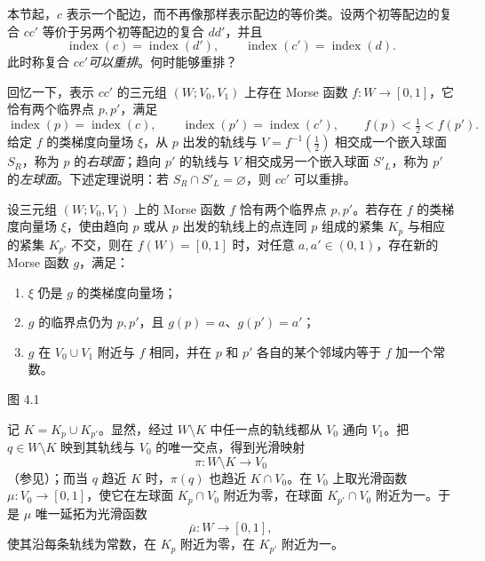 
\label{sec4:page37-notation}本节起，$c$ 表示一个配边，而不再像那样表示配边的等价类。设两个初等配边的复合 $cc'$ 等价于另两个初等配边的复合 $dd'$，并且
\[
  \operatorname{index}(c)=\operatorname{index}(d'),
  \qquad
  \operatorname{index}(c')=\operatorname{index}(d).
\]
此时称复合 $cc'$\emph{可以重排}。何时能够重排？

回忆一下，表示 $cc'$ 的三元组 $(W;V_0,V_1)$ 上存在 Morse 函数
$f:W\to[0,1]$，它恰有两个临界点 $p,p'$，满足
\[
  \operatorname{index}(p)=\operatorname{index}(c),
  \qquad
  \operatorname{index}(p')=\operatorname{index}(c'),
  \qquad
  f(p)<\tfrac12<f(p').
\]
给定 $f$ 的类梯度向量场 $\xi$，从 $p$ 出发的轨线与
$V=f^{-1}(\tfrac12)$ 相交成一个嵌入球面 $S_R$，称为 $p$ 的\emph{右球面}；趋向 $p'$ 的轨线与 $V$ 相交成另一个嵌入球面 $S'_L$，称为 $p'$ 的\emph{左球面}。下述定理说明：若 $S_R\cap S'_L=\varnothing$，则 $cc'$ 可以重排。

设三元组 $(W;V_0,V_1)$ 上的 Morse 函数 $f$ 恰有两个临界点 $p,p'$。若存在 $f$ 的类梯度向量场 $\xi$，使由趋向 $p$ 或从 $p$ 出发的轨线上的点连同 $p$ 组成的紧集 $K_p$ 与相应的紧集 $K_{p'}$ 不交，则在 $f(W)=[0,1]$ 时，对任意 $a,a'\in(0,1)$，存在新的 Morse 函数 $g$，满足：
\begin{enumerate}[label=(\alph*)]
  \item $\xi$ 仍是 $g$ 的类梯度向量场；
  \item $g$ 的临界点仍为 $p,p'$，且 $g(p)=a$、$g(p')=a'$；
  \item $g$ 在 $V_0\cup V_1$ 附近与 $f$ 相同，并在 $p$ 和 $p'$ 各自的某个邻域内等于 $f$ 加一个常数。
\end{enumerate}

\begin{center}
  \FigFourOne

  \label{fig:4.1}图 4.1
\end{center}

\Proof 记 $K=K_p\cup K_{p'}$。显然，经过 $W\setminus K$ 中任一点的轨线都从 $V_0$ 通向 $V_1$。把 $q\in W\setminus K$ 映到其轨线与 $V_0$ 的唯一交点，得到光滑映射
\[
  \pi:W\setminus K\longrightarrow V_0
\]
（参见）；而当 $q$ 趋近 $K$ 时，$\pi(q)$ 也趋近 $K\cap V_0$。在 $V_0$ 上取光滑函数 $\mu:V_0\to[0,1]$，使它在左球面 $K_p\cap V_0$ 附近为零，在球面 $K_{p'}\cap V_0$ 附近为一。于是 $\mu$ 唯一延拓为光滑函数
\[
  \bar\mu:W\longrightarrow[0,1],
\]
使其沿每条轨线为常数，在 $K_p$ 附近为零，在 $K_{p'}$ 附近为一。

